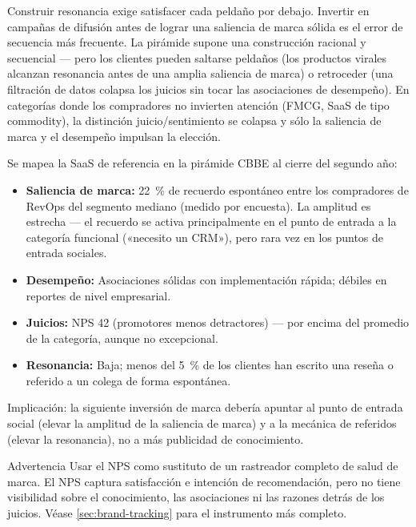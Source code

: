 Construir resonancia exige satisfacer cada peldaño por debajo. Invertir en campañas de difusión antes de lograr una saliencia de marca sólida es el error de secuencia más frecuente. La pirámide supone una construcción racional y secuencial --- pero los clientes pueden saltarse peldaños (los productos virales alcanzan resonancia antes de una amplia saliencia de marca) o retroceder (una filtración de datos colapsa los juicios sin tocar las asociaciones de desempeño). En categorías donde los compradores no invierten atención (FMCG, SaaS de tipo commodity), la distinción juicio/sentimiento se colapsa y sólo la saliencia de marca y el desempeño impulsan la elección.

\begin{example}
Se mapea la SaaS de referencia en la pirámide CBBE al cierre del segundo año:
\begin{itemize}
  \item \textbf{Saliencia de marca:} \qty{22}{\percent} de recuerdo espontáneo entre los compradores de RevOps del segmento mediano (medido por encuesta). La amplitud es estrecha --- el recuerdo se activa principalmente en el punto de entrada a la categoría funcional («necesito un CRM»), pero rara vez en los puntos de entrada sociales.
  \item \textbf{Desempeño:} Asociaciones sólidas con implementación rápida; débiles en reportes de nivel empresarial.
  \item \textbf{Juicios:} NPS 42 (promotores menos detractores) --- por encima del promedio de la categoría, aunque no excepcional.
  \item \textbf{Resonancia:} Baja; menos del \qty{5}{\percent} de los clientes han escrito una reseña o referido a un colega de forma espontánea.
\end{itemize}
Implicación: la siguiente inversión de marca debería apuntar al punto de entrada social (elevar la amplitud de la saliencia de marca) y a la mecánica de referidos (elevar la resonancia), no a más publicidad de conocimiento.
\end{example}

\begin{admonition}{Advertencia}
Usar el NPS como sustituto de un rastreador completo de salud de marca. El NPS captura satisfacción e intención de recomendación, pero no tiene visibilidad sobre el conocimiento, las asociaciones ni las razones detrás de los juicios. Véase \cref{sec:brand-tracking} para el instrumento más completo.
\end{admonition}

